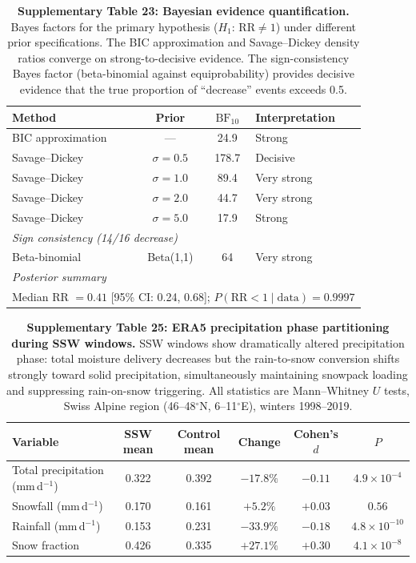 \documentclass[11pt,letterpaper]{article}
\begin{document}
\begin{table}[!ht]
\centering
\caption{\textbf{Supplementary Table 23: Bayesian evidence quantification.}
Bayes factors for the primary hypothesis ($H_1$: $\mathrm{RR} \neq 1$) under different prior specifications. The BIC approximation and Savage--Dickey density ratios converge on strong-to-decisive evidence. The sign-consistency Bayes factor (beta-binomial against equiprobability) provides decisive evidence that the true proportion of ``decrease'' events exceeds 0.5.}
\label{tab:bayesian}
\small
\begin{tabular}{lccl}
\toprule
Method & Prior & $\mathrm{BF}_{10}$ & Interpretation \\
\midrule
BIC approximation & --- & 24.9 & Strong \\
Savage--Dickey & $\sigma = 0.5$ & 178.7 & Decisive \\
Savage--Dickey & $\sigma = 1.0$ & 89.4 & Very strong \\
Savage--Dickey & $\sigma = 2.0$ & 44.7 & Very strong \\
Savage--Dickey & $\sigma = 5.0$ & 17.9 & Strong \\
\midrule
\multicolumn{4}{l}{\textit{Sign consistency (14/16 decrease)}} \\
Beta-binomial & Beta(1,1) & 64 & Very strong \\
\midrule
\multicolumn{4}{l}{\textit{Posterior summary}} \\
\multicolumn{4}{l}{Median RR $= 0.41$ [95\% CI: 0.24, 0.68]; $P(\mathrm{RR} < 1 \mid \mathrm{data}) = 0.9997$} \\
\bottomrule
\end{tabular}
\end{table}

\begin{table}[!ht]
\centering
\caption{\textbf{Supplementary Table 25: ERA5 precipitation phase partitioning during SSW windows.}
SSW windows show dramatically altered precipitation phase: total moisture delivery decreases but the rain-to-snow conversion shifts strongly toward solid precipitation, simultaneously maintaining snowpack loading and suppressing rain-on-snow triggering. All statistics are Mann--Whitney $U$ tests, Swiss Alpine region (46--48$^\circ$N, 6--11$^\circ$E), winters 1998--2019.}
\label{tab:precip_phase}
\small
\begin{tabular}{lccccc}
\toprule
Variable & SSW mean & Control mean & Change & Cohen's $d$ & $P$ \\
\midrule
Total precipitation (mm\,d$^{-1}$) & 0.322 & 0.392 & $-17.8\%$ & $-0.11$ & $4.9 \times 10^{-4}$ \\
Snowfall (mm\,d$^{-1}$) & 0.170 & 0.161 & $+5.2\%$ & $+0.03$ & $0.56$ \\
Rainfall (mm\,d$^{-1}$) & 0.153 & 0.231 & $-33.9\%$ & $-0.18$ & $4.8 \times 10^{-10}$ \\
Snow fraction & 0.426 & 0.335 & $+27.1\%$ & $+0.30$ & $4.1 \times 10^{-8}$ \\
\bottomrule
\end{tabular}
\end{table}
\end{document}
